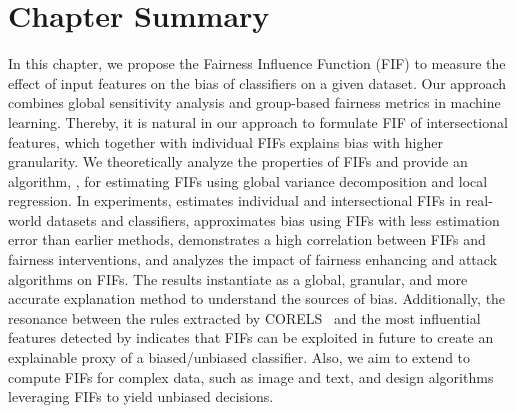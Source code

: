 \section{Chapter Summary}


In this chapter, we propose the Fairness Influence Function (FIF) to measure the effect of input features on the bias of classifiers on a given dataset. Our approach combines global sensitivity analysis and group-based fairness metrics in machine learning. Thereby, it is natural in our approach to formulate FIF of intersectional features, which together with individual FIFs explains bias with higher granularity. We theoretically analyze the properties of FIFs and provide an algorithm, {\fairXplainer}, for estimating FIFs using global variance decomposition and local regression. In experiments, {\fairXplainer} estimates individual and intersectional FIFs in real-world datasets and classifiers, approximates bias using FIFs with less estimation error than earlier methods, demonstrates a high correlation between FIFs and fairness interventions, and analyzes the impact of fairness enhancing and attack algorithms on FIFs. The results instantiate {\fairXplainer} as a global, granular, and more accurate explanation method to understand the sources of bias. Additionally, the resonance between the rules extracted by CORELS~\cite{rudin2019stop} and the most influential features detected by {\fairXplainer} indicates that FIFs can be exploited in future to create an explainable proxy of a biased/unbiased classifier. Also, we aim to extend {\fairXplainer} to compute FIFs for complex data, such as image and text, and design algorithms leveraging FIFs to yield unbiased decisions.
%